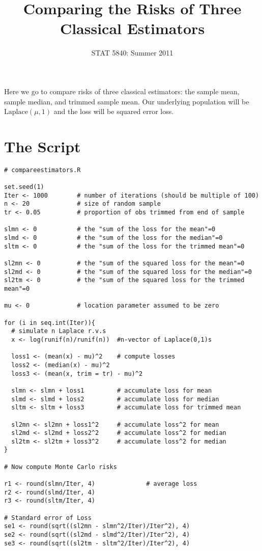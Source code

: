 \documentclass[11pt,english]{article}
\title{Comparing the Risks of Three Classical Estimators}
\date{STAT 5840: Summer 2011}
\begin{document}
\maketitle

\thispagestyle{empty}

Here we go to compare risks of three classical estimators: the sample mean, sample median, and trimmed sample mean.  Our underlying population will be $\mathrm{Laplace}(\mu,1)$ and the loss will be squared error loss.

\section*{The Script}
\label{sec-1}



\begin{verbatim}
# compareestimators.R

set.seed(1)
Iter <- 1000        # number of iterations (should be multiple of 100)
n <- 20             # size of random sample
tr <- 0.05          # proportion of obs trimmed from end of sample

slmn <- 0           # the "sum of the loss for the mean"=0
slmd <- 0           # the "sum of the loss for the median"=0
sltm <- 0           # the "sum of the loss for the trimmed mean"=0

sl2mn <- 0          # the "sum of the squared loss for the mean"=0
sl2md <- 0          # the "sum of the squared loss for the median"=0
sl2tm <- 0          # the "sum of the squared loss for the trimmed mean"=0

mu <- 0             # location parameter assumed to be zero

for (i in seq.int(Iter)){
  # simulate n Laplace r.v.s
  x <- log(runif(n)/runif(n))  #n-vector of Laplace(0,1)s
                             
  loss1 <- (mean(x) - mu)^2    # compute losses
  loss2 <- (median(x) - mu)^2
  loss3 <- (mean(x, trim = tr) - mu)^2

  slmn <- slmn + loss1         # accumulate loss for mean
  slmd <- slmd + loss2         # accumulate loss for median
  sltm <- sltm + loss3         # accumulate loss for trimmed mean

  sl2mn <- sl2mn + loss1^2     # accumulate loss^2 for mean
  sl2md <- sl2md + loss2^2     # accumulate loss^2 for median
  sl2tm <- sl2tm + loss3^2     # accumulate loss^2 for median
}

# Now compute Monte Carlo risks

r1 <- round(slmn/Iter, 4)              # average loss
r2 <- round(slmd/Iter, 4)
r3 <- round(sltm/Iter, 4)

# Standard error of Loss
se1 <- round(sqrt((sl2mn - slmn^2/Iter)/Iter^2), 4)
se2 <- round(sqrt((sl2md - slmd^2/Iter)/Iter^2), 4)
se3 <- round(sqrt((sl2tm - sltm^2/Iter)/Iter^2), 4)
\end{verbatim}
\end{document}
